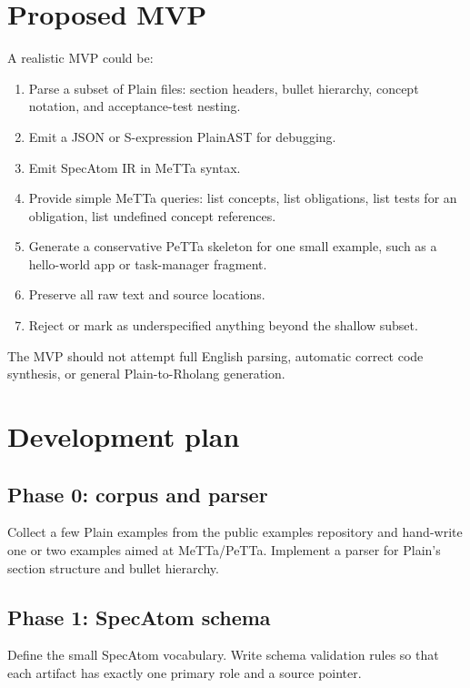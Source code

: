 \documentclass[11pt]{article}
\begin{document}
\section{Proposed MVP}

A realistic MVP could be:

\begin{enumerate}
\item Parse a subset of Plain files: section headers, bullet hierarchy, concept
notation, and acceptance-test nesting.
\item Emit a JSON or S-expression PlainAST for debugging.
\item Emit SpecAtom IR in MeTTa syntax.
\item Provide simple MeTTa queries: list concepts, list obligations, list tests
for an obligation, list undefined concept references.
\item Generate a conservative PeTTa skeleton for one small example, such as a
hello-world app or task-manager fragment.
\item Preserve all raw text and source locations.
\item Reject or mark as underspecified anything beyond the shallow subset.
\end{enumerate}

The MVP should not attempt full English parsing, automatic correct code
synthesis, or general Plain-to-Rholang generation.

\section{Development plan}

\subsection{Phase 0: corpus and parser}

Collect a few Plain examples from the public examples repository and hand-write
one or two examples aimed at MeTTa/PeTTa. Implement a parser for Plain's section
structure and bullet hierarchy.

\subsection{Phase 1: SpecAtom schema}

Define the small SpecAtom vocabulary. Write schema validation rules so that each
artifact has exactly one primary role and a source pointer.
\end{document}
